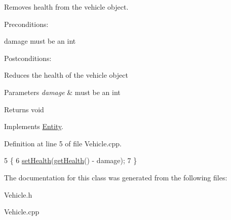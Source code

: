 Removes health from the vehicle object. 

Preconditions\+:
\begin{DoxyItemize}
\item damage must be an int
\end{DoxyItemize}

Postconditions\+:
\begin{DoxyItemize}
\item Reduces the health of the vehicle object
\end{DoxyItemize}


\begin{DoxyParams}{Parameters}
{\em damage} & must be an int \\
\hline
\end{DoxyParams}
\begin{DoxyReturn}{Returns}
void 
\end{DoxyReturn}


Implements \hyperlink{classEntity}{Entity}.



Definition at line 5 of file Vehicle.\+cpp.


\begin{DoxyCode}
5                                    \{
6     \hyperlink{classEntity_a7dae281ff92be9bc98672cafe05c77ab}{setHealth}(\hyperlink{classEntity_a2b0140ae8c77c0e3654b070ee3c7fe57}{getHealth}() - damage);
7 \}
\end{DoxyCode}


The documentation for this class was generated from the following files\+:\begin{DoxyCompactItemize}
\item 
Vehicle.\+h\item 
Vehicle.\+cpp\end{DoxyCompactItemize}
